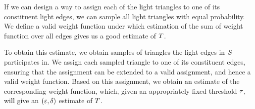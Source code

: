 If we can design a way to assign each of the light triangles to one of its constituent light edges, we can sample all light triangles with equal probability. We define a valid weight function under which estimation of the sum of weight function over all edges gives us a good estimate of $T$.

To obtain this estimate, we obtain samples of triangles the light edges in $S$ participates in. We assign each sampled triangle to one of its constituent edges, ensuring that the assignment can be extended to a valid assignment, and hence a valid weight function. Based on this assignment, we obtain an estimate of the corresponding weight function, which, given an appropriately fixed threshold $\tau$, will give an $\left({\varepsilon,\delta}\right)$ estimate of $T$.

